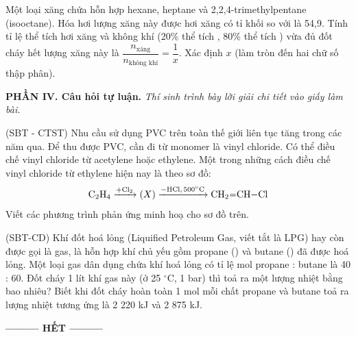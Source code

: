 \documentclass[12pt,a4paper]{article}
\begin{document}
\begin{ex}
Một loại xăng chứa hỗn hợp hexane, heptane và 2,2,4-trimethylpentane (isooctane). Hóa hơi lượng xăng này được hơi xăng có tỉ khối so với  là 54,9. Tính tỉ lệ thể tích hơi xăng và không khí (20\% thể tích , 80\% thể tích ) vừa đủ đốt cháy hết lượng xăng này là $\dfrac{n_{\text{xăng}}}{n_{\text{không khí}}} = \dfrac{1}{x}$. Xác định $x$ (làm tròn đến hai chữ số thập phân).
\end{ex}

\bigskip
\noindent\textbf{\large PHẦN IV. Câu hỏi tự luận.}
\textit{Thí sinh trình bày lời giải chi tiết vào giấy làm bài.}
\vspace{0.2cm}

\begin{ex}
(SBT - CTST) Nhu cầu sử dụng PVC trên toàn thế giới liên tục tăng trong các năm qua. Để thu được PVC, cần đi từ monomer là vinyl chloride. Có thể điều chế vinyl chloride từ acetylene hoặc ethylene. Một trong những cách điều chế vinyl chloride từ ethylene hiện nay là theo sơ đồ:
\[
\ce{C2H4} \xrightarrow{+\ce{Cl2}} (X) \xrightarrow{-\ce{HCl},\, 500^\circ\text{C}} \ce{CH2=CH-Cl}
\]
Viết các phương trình phản ứng minh hoạ cho sơ đồ trên.

\vspace{4.0cm}

\end{ex}

\begin{ex}
(SBT-CD) Khí đốt hoá lỏng (Liquified Petroleum Gas, viết tắt là LPG) hay còn được gọi là gas, là hỗn hợp khí chủ yếu gồm propane () và butane () đã được hoá lỏng. Một loại gas dân dụng chứa khí hoá lỏng có tỉ lệ mol propane : butane là 40 : 60. Đốt cháy 1 lít khí gas này (ở 25 $^\circ\text{C}$, 1 bar) thì toả ra một lượng nhiệt bằng bao nhiêu? Biết khi đốt cháy hoàn toàn 1 mol mỗi chất propane và butane toả ra lượng nhiệt tương ứng là 2 220 kJ và 2 875 kJ.

\vspace{4.0cm}

\end{ex}

\begin{center}
\textbf{--------- HẾT ---------}
\end{center}
\end{document}
